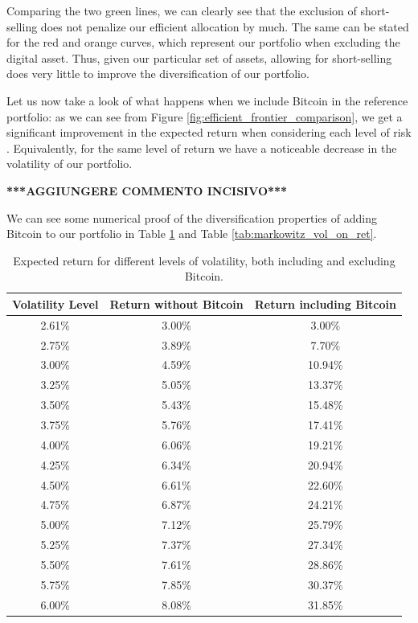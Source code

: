 Comparing the two green lines, we can clearly see that the exclusion of short-selling does not penalize our efficient allocation by much. The same can be stated for the red and orange curves, which represent our portfolio when excluding the digital asset.
Thus, given our particular set of assets, allowing for short-selling does very little to improve the diversification of our portfolio.

Let us now take a look of what happens when we include Bitcoin in the reference portfolio: as we can see from Figure \ref{fig:efficient_frontier_comparison}, we get a significant improvement in the expected return when considering each level of risk . Equivalently, for the same level of return we have a noticeable decrease in the volatility of our portfolio.

\textbf{***AGGIUNGERE COMMENTO INCISIVO***}

We can see some numerical proof of the diversification properties of adding Bitcoin to our portfolio in Table \ref{tab:markowitz_ret_on_vol} and Table	\ref{tab:markowitz_vol_on_ret}.

\begin{table}
	\centering
	\caption[Markowitz efficient frontier on volatility]{Expected return for different levels of volatility, both including and excluding Bitcoin.}
	\label{tab:markowitz_ret_on_vol}
\begin{tabular}{ccc}

Volatility Level & Return without Bitcoin & Return including Bitcoin \\
\midrule
2.61\% & 3.00\% & 3.00\% \\
2.75\% & 3.89\% & 7.70\% \\
3.00\% & 4.59\% & 10.94\% \\
3.25\% & 5.05\% & 13.37\% \\
3.50\% & 5.43\% & 15.48\% \\
3.75\% & 5.76\% & 17.41\% \\
4.00\% & 6.06\% & 19.21\% \\
4.25\% & 6.34\% & 20.94\% \\
4.50\% & 6.61\% & 22.60\% \\
4.75\% & 6.87\% & 24.21\% \\
5.00\% & 7.12\% & 25.79\% \\
5.25\% & 7.37\% & 27.34\% \\
5.50\% & 7.61\% & 28.86\% \\
5.75\% & 7.85\% & 30.37\% \\
6.00\% & 8.08\% & 31.85\% \\
\midrule
\end{tabular}
\end{table}

